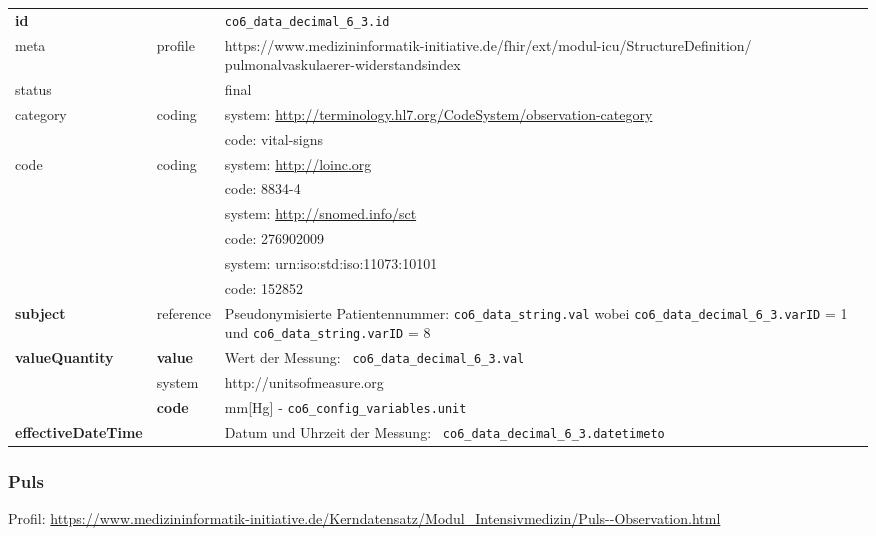 \begin{longtable}{|l|l|p{7.5cm}|}
	\hline
	\rowcolor{lightgray} \multicolumn{3}{|l|}{Data Mapping (inhaltlich)} \\ \hline
	\textbf{id} &  & \texttt{co6\_data\_decimal\_6\_3.id} \\ \hline
	meta & profile & https://www.medizininformatik-initiative.de/fhir/ext/modul-icu/StructureDefinition/
	pulmonalvaskulaerer-widerstandsindex \\ \hline 
	status &  & final   \\ \hline 
	category & coding & system: \url{http://terminology.hl7.org/CodeSystem/observation-category} \\
	\cline{3-3}
	& & code: vital-signs\\ \hline
	code & coding & system: \url{http://loinc.org} \\ 
	\cline{3-3} 
	&  & code: 8834-4 \\ 
	\cline{3-3} 
	&  & system: \url{http://snomed.info/sct} \\ 
	\cline{3-3}
	&  & code: 276902009 \\ 
	\cline{3-3} 
	&  & system: urn:iso:std:iso:11073:10101 \\ 
	\cline{3-3}
	&  & code: 152852 \\ \hline
	\textbf{subject} & reference & Pseudonymisierte Patientennummer: \texttt{co6\_data\_string.val} wobei \texttt{co6\_data\_decimal\_6\_3.varID} = 1 und \texttt{co6\_data\_string.varID} = 8 \\ \hline
	\textbf{valueQuantity}  & \textbf{value} & Wert der Messung: \texttt{
		co6\_data\_decimal\_6\_3.val} \\
	\cline{2-3}
	& system & http://unitsofmeasure.org \\
	\cline{2-3}
	& \textbf{code} & mm[Hg] - \texttt{co6\_config\_variables.unit} \\ \hline
	\textbf{effectiveDateTime}  & & Datum und Uhrzeit der Messung: \texttt{
		co6\_data\_decimal\_6\_3.datetimeto} \\
	\hline
\end{longtable}

\subsubsection{Puls}

Profil: \url{https://www.medizininformatik-initiative.de/Kerndatensatz/Modul_Intensivmedizin/Puls--Observation.html}

